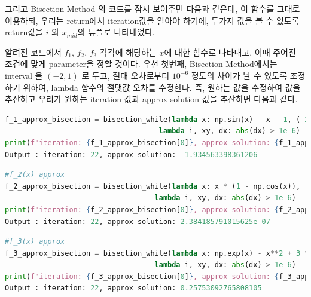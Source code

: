 \documentclass[11pt]{article}
\begin{document}
\noindent
그리고 Bisection Method 의 코드를 잠시 보여주면 다음과 같은데, 이 함수를 그대로 이용하되, 우리는 return에서 iteration값을 알아야 하기에, 두가지 값을 볼 수 있도록 return값을 $i$ 와 $x_{mid}$의 튜플로 나타내었다.

\vspace{5mm}

\vspace{5mm}

\noindent
알려진 코드에서 $f_1$, $f_2$, $f_3$ 각각에 해당하는 $x$에 대한 함수로 나타내고, 이때 주어진 조건에 맞게 parameter을 정할 것이다. 우선 첫번째, Bisection Method에서는 interval 을 $(-2, 1)$ 로 두고, 절대 오차로부터 $10^{-6}$ 정도의 차이가 날 수 있도록 조정하기 위하여, lambda 함수의 절댓값 오차를 수정한다. 즉, 원하는 값을 수정하여 값을 추산하고 우리가 원하는 iteration 값과 approx solution 값을 추산하면 다음과 같다.

\begin{lstlisting}[language=Python]
f_1_approx_bisection = bisection_while(lambda x: np.sin(x) - x - 1, (-2,1), 
									lambda i, xy, dx: abs(dx) > 1e-6)
print(f"iteration: {f_1_approx_bisection[0]}, approx solution: {f_1_approx_bisection[1]}") 
Output : iteration: 22, approx solution: -1.934563398361206
\end{lstlisting}


\begin{lstlisting}[language=Python]
#f_2(x) approx
f_2_approx_bisection = bisection_while(lambda x: x * (1 - np.cos(x)), (-2,1),
                                   lambda i, xy, dx: abs(dx) > 1e-6)
print(f"iteration: {f_2_approx_bisection[0]}, approx solution: {f_2_approx_bisection[1]}")
Output : iteration: 22, approx solution: 2.384185791015625e-07
\end{lstlisting}

\begin{lstlisting}[language=Python]
#f_3(x) approx
f_3_approx_bisection = bisection_while(lambda x: np.exp(x) - x**2 + 3 * x - 2, (-2,1),
                                   lambda i, xy, dx: abs(dx) > 1e-6)
print(f"iteration: {f_3_approx_bisection[0]}, approx solution: {f_3_approx_bisection[1]}")
Output : iteration: 22, approx solution: 0.25753092765808105
\end{lstlisting}
\end{document}
